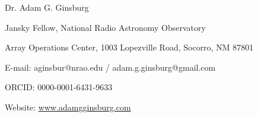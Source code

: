 \begin{center}
{\large Dr. Adam G. Ginsburg}\\
\par Jansky Fellow, National Radio Astronomy Observatory
\par Array Operations Center,
 1003 Lopezville Road,
 Socorro, NM 87801
\par E-mail: aginsbur@nrao.edu / adam.g.ginsburg@gmail.com
\par ORCID: 0000-0001-6431-9633
\par Website: \url{www.adamgginsburg.com}
\end{center}

